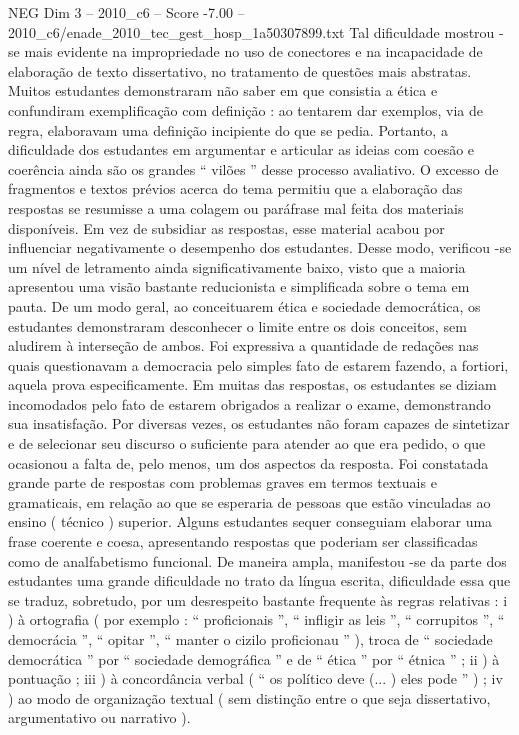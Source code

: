 \begin{textsample}{NEG Dim 3 – 2010\_c6 – Score -7.00 – 2010\_c6/enade\_2010\_tec\_gest\_hosp\_1a50307899.txt}
Tal dificuldade mostrou -se mais evidente na impropriedade no uso de conectores e na incapacidade de elaboração de texto dissertativo, no tratamento de questões mais abstratas.
Muitos estudantes demonstraram não saber em que consistia a ética e confundiram exemplificação com definição : ao tentarem dar exemplos, via de regra, elaboravam uma definição incipiente do que se pedia.
Portanto, a dificuldade dos estudantes em argumentar e articular as ideias com coesão e coerência ainda são os grandes “ vilões ” desse processo avaliativo.
O excesso de fragmentos e textos prévios acerca do tema permitiu que a elaboração das respostas se resumisse a uma colagem ou paráfrase mal feita dos materiais disponíveis.
Em vez de subsidiar as respostas, esse material acabou por influenciar negativamente o desempenho dos estudantes.
Desse modo, verificou -se um nível de letramento ainda significativamente baixo, visto que a maioria apresentou uma visão bastante reducionista e simplificada sobre o tema em pauta.
De um modo geral, ao conceituarem ética e sociedade democrática, os estudantes demonstraram desconhecer o limite entre os dois conceitos, sem aludirem à interseção de ambos.
Foi expressiva a quantidade de redações nas quais questionavam a democracia pelo simples fato de estarem fazendo, a fortiori, aquela prova especificamente.
Em muitas das respostas, os estudantes se diziam incomodados pelo fato de estarem obrigados a realizar o exame, demonstrando sua insatisfação.
Por diversas vezes, os estudantes não foram capazes de sintetizar e de selecionar seu discurso o suficiente para atender ao que era pedido, o que ocasionou a falta de, pelo menos, um dos aspectos da resposta.
Foi constatada grande parte de respostas com problemas graves em termos textuais e gramaticais, em relação ao que se esperaria de pessoas que estão vinculadas ao ensino ( técnico ) superior.
Alguns estudantes sequer conseguiam elaborar uma frase coerente e coesa, apresentando respostas que poderiam ser classificadas como de analfabetismo funcional.
De maneira ampla, manifestou -se da parte dos estudantes uma grande dificuldade no trato da língua escrita, dificuldade essa que se traduz, sobretudo, por um desrespeito bastante frequente às regras relativas : i ) à ortografia ( por exemplo : “ proficionais ”, “ infligir as leis ”, “ corrupitos ”, “ democrácia ”, “ opitar ”, “ manter o cizilo proficionau ” ), troca de “ sociedade democrática ” por “ sociedade demográfica ” e de “ ética ” por “ étnica ” ; ii ) à pontuação ; iii ) à concordância verbal ( “ os político deve (... ) eles pode ” ) ; iv ) ao modo de organização textual ( sem distinção entre o que seja dissertativo, argumentativo ou narrativo ).

\end{textsample}
